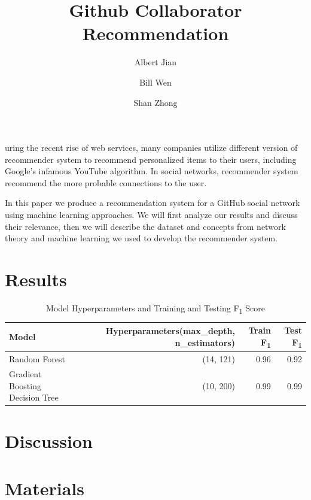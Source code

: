 \documentclass[9pt,twoside]{pnas-new}
\title{Github Collaborator Recommendation}
\author[a]{Albert Jian}
\author[a]{Bill Wen}
\author[a]{Shan Zhong}
\affil[a]{University of California, Los Angeles}
\begin{document}
\maketitle
\thispagestyle{firststyle}

uring the recent rise of web services, many companies utilize different version of recommender system to recommend personalized items to their users, including Google's infamous YouTube algorithm. In social networks, recommender system recommend the more probable connections to the user. 

In this paper we produce a recommendation system for a GitHub social network using machine learning approaches. We will first analyze our results and discuss their relevance, then we will describe the dataset and concepts from network theory and machine learning we used to develop the recommender system.

\section*{Results}

\begin{table}[th]
    \centering
    \caption{Model Hyperparameters and Training and Testing F\textsubscript{1} Score}
    \begin{tabular}{lrrr}
    Model & Hyperparameters(max\_depth, n\_estimators) & Train F\textsubscript{1} & Test F\textsubscript{1} \\
    \midrule
    Random Forest & (14, 121) & 0.96 & 0.92 \\
    Gradient Boosting Decision Tree & (10, 200) & 0.99 & 0.99 \\
    \bottomrule
    \end{tabular}
\end{table}   

\section*{Discussion}

\section*{Materials}
\end{document}

